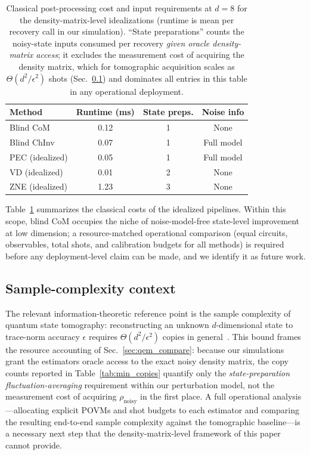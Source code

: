 \documentclass[a4paper,onecolumn]{quantumarticle}
\newcommand{\rhon}{\rho_\mathrm{noisy}}
\begin{document}
\begin{table}[!tb]
\caption{Classical post-processing cost and input requirements at $d = 8$ for the density-matrix-level idealizations (runtime is mean per recovery call in our simulation).
``State preparations'' counts the noisy-state inputs consumed per recovery \emph{given oracle density-matrix access}; it excludes the measurement cost of acquiring the density matrix, which for tomographic acquisition scales as $\Theta(d^2/\epsilon^2)$ shots (Sec.~\ref{sec:sample_complexity}) and dominates all entries in this table in any operational deployment.}
\label{tab:overhead}

\begin{tabular}{lccc}
Method & Runtime (ms) & State preps. & Noise info \\
\hline
Blind CoM      & 0.12 & 1 & None \\
Blind ChInv    & 0.07 & 1 & Full model \\
PEC (idealized) & 0.05 & 1 & Full model \\
VD (idealized)  & 0.01 & 2 & None \\
ZNE (idealized) & 1.23 & 3 & None \\
\end{tabular}

\end{table}

Table~\ref{tab:overhead} summarizes the classical costs of the idealized pipelines.
Within this scope, blind CoM occupies the niche of noise-model-free state-level improvement at low dimension; a resource-matched operational comparison (equal circuits, observables, total shots, and calibration budgets for all methods) is required before any deployment-level claim can be made, and we identify it as future work.


\subsection{Sample-complexity context}
\label{sec:sample_complexity}

The relevant information-theoretic reference point is the sample complexity of quantum state tomography: reconstructing an unknown $d$-dimensional state to trace-norm accuracy $\epsilon$ requires $\Theta(d^2/\epsilon^2)$ copies in general~\cite{Haah2017}.
This bound frames the resource accounting of Sec.~\ref{sec:qem_compare}: because our simulations grant the estimators oracle access to the exact noisy density matrix, the copy counts reported in Table~\ref{tab:min_copies} quantify only the \emph{state-preparation fluctuation-averaging} requirement within our perturbation model, not the measurement cost of acquiring $\rhon$ in the first place.
A full operational analysis---allocating explicit POVMs and shot budgets to each estimator and comparing the resulting end-to-end sample complexity against the tomographic baseline---is a necessary next step that the density-matrix-level framework of this paper cannot provide.
\end{document}
